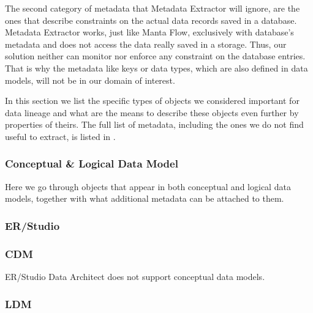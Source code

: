 The second category of metadata that Metadata Extractor will ignore, are the ones that describe constraints on the actual data records saved in a database. 
Metadata Extractor works, just like Manta Flow, exclusively with database's metadata and does not access the data really saved in a storage. 
Thus, our solution neither can monitor nor enforce any constraint on the database entries. 
That is why the metadata like keys or data types, which are also defined in data models, will not be in our domain of interest.

In this section we list the specific types of objects we considered important for data lineage and what are the means to describe these objects even further by properties of theirs. 
The full list of metadata, including the ones we do not find useful to extract, is listed in .

\subsubsection{Conceptual \& Logical Data Model}

Here we go through objects that appear in both conceptual and logical data models, together with what additional metadata can be attached to them.

\subsubsection{ER/Studio}

\subsubsection{CDM}

ER/Studio Data Architect does not support conceptual data models.

\subsubsection{LDM}

